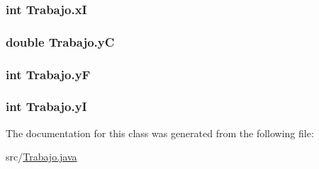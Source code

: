 \subsubsection[{\texorpdfstring{xI}{xI}}]{\setlength{\rightskip}{0pt plus 5cm}int Trabajo.\+xI}\hypertarget{classTrabajo_a92e061e1e5acd2e5e771cb45a0ead2cf}{}\label{classTrabajo_a92e061e1e5acd2e5e771cb45a0ead2cf}
\subsubsection[{\texorpdfstring{yC}{yC}}]{\setlength{\rightskip}{0pt plus 5cm}double Trabajo.\+yC}\hypertarget{classTrabajo_ab12a7045e2dbd243910e3d3b2f6961c9}{}\label{classTrabajo_ab12a7045e2dbd243910e3d3b2f6961c9}
\subsubsection[{\texorpdfstring{yF}{yF}}]{\setlength{\rightskip}{0pt plus 5cm}int Trabajo.\+yF}\hypertarget{classTrabajo_afef4f766ca0c979b9bd99a6b951314e9}{}\label{classTrabajo_afef4f766ca0c979b9bd99a6b951314e9}
\subsubsection[{\texorpdfstring{yI}{yI}}]{\setlength{\rightskip}{0pt plus 5cm}int Trabajo.\+yI}\hypertarget{classTrabajo_ad2ebae404264d7c3e804dc126ecaaa96}{}\label{classTrabajo_ad2ebae404264d7c3e804dc126ecaaa96}


The documentation for this class was generated from the following file\+:\begin{DoxyCompactItemize}
\item 
src/\hyperlink{Trabajo_8java}{Trabajo.\+java}\end{DoxyCompactItemize}
